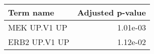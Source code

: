 \begin{tabular}{lr}
\toprule
     Term name &  Adjusted p-value \\
\midrule
  MEK UP.V1 UP &          1.01e-03 \\
 ERB2 UP.V1 UP &          1.12e-02 \\
\bottomrule
\end{tabular}

